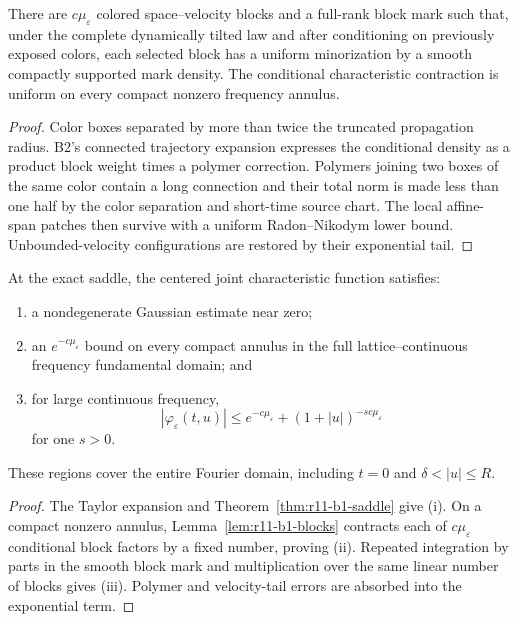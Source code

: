 \begin{lemma}
\label{lem:r11-b1-blocks}
There are $c\mu_\varepsilon$ colored space--velocity blocks and a full-rank
block mark such that, under the complete dynamically tilted law and after
conditioning on previously exposed colors, each selected block has a uniform
minorization by a smooth compactly supported mark density.  The conditional
characteristic contraction is uniform on every compact nonzero frequency
annulus.
\end{lemma}

\begin{proof}
Color boxes separated by more than twice the truncated propagation radius.
B2's connected trajectory expansion expresses the conditional density as a
product block weight times a polymer correction.  Polymers joining two boxes
of the same color contain a long connection and their total norm is made less
than one half by the color separation and short-time source chart.  The local
affine-span patches then survive with a uniform Radon--Nikodym lower bound.
Unbounded-velocity configurations are restored by their exponential tail.
\end{proof}

\begin{theorem}
\label{thm:r11-b1-fourier}
At the exact saddle, the centered joint characteristic function satisfies:
\begin{enumerate}[label=(\roman*)]
\item a nondegenerate Gaussian estimate near zero;
\item an $e^{-c\mu_\varepsilon}$ bound on every compact annulus in the full
      lattice--continuous frequency fundamental domain; and
\item for large continuous frequency,
\[
 |\varphi_\varepsilon(t,u)|
 \le e^{-c\mu_\varepsilon}+(1+|u|)^{-s c\mu_\varepsilon}
\]
for one $s>0$.
\end{enumerate}
These regions cover the entire Fourier domain, including
$t=0$ and $\delta<|u|\le R$.
\end{theorem}

\begin{proof}
The Taylor expansion and Theorem~\ref{thm:r11-b1-saddle} give (i).  On a
compact nonzero annulus, Lemma~\ref{lem:r11-b1-blocks} contracts each of
$c\mu_\varepsilon$ conditional block factors by a fixed number, proving (ii).
Repeated integration by parts in the smooth block mark and multiplication over
the same linear number of blocks gives (iii).  Polymer and velocity-tail
errors are absorbed into the exponential term.
\end{proof}

